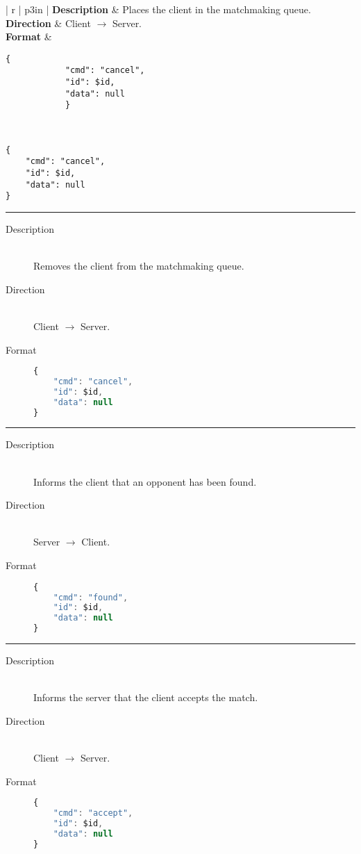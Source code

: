 \begin{table}[!ht]
	\centering
	\begin{tabular}{| r | p{3in} |}
		\hline
		\textbf{Description} & Places the client in the matchmaking queue. \\ \hline
		\textbf{Direction} & Client $\rightarrow$ Server. \\ \hline
		\textbf{Format} &
			\begin{verbatim}{
			"cmd": "cancel",
			"id": $id,
			"data": null
			}\end{verbatim} \\ \hline
	\end{tabular}
	\caption{}
	\label{}
\end{table}

\begin{verbatim}
{
	"cmd": "cancel",
	"id": $id,
	"data": null
}
\end{verbatim}

\hrule

\begin{description}
\item[Description] \hfill \\
	Removes the client from the matchmaking queue.
\item[Direction] \hfill \\
	Client $\rightarrow$ Server.
\item[Format] \hfill
\begin{lstlisting}[language=JavaScript]
{
	"cmd": "cancel",
	"id": $id,
	"data": null
}
\end{lstlisting}
\end{description}

\hrule

\begin{description}
\item[Description] \hfill \\
	Informs the client that an opponent has been found.
\item[Direction] \hfill \\
	Server $\rightarrow$ Client.
\item[Format] \hfill
\begin{lstlisting}[language=JavaScript]
{
	"cmd": "found",
	"id": $id,
	"data": null
}
\end{lstlisting}
\end{description}

\hrule

\begin{description}
\item[Description] \hfill \\
	Informs the server that the client accepts the match.
\item[Direction] \hfill \\
	Client $\rightarrow$ Server.
\item[Format] \hfill
\begin{lstlisting}[language=JavaScript]
{
	"cmd": "accept",
	"id": $id,
	"data": null
}
\end{lstlisting}
\end{description}

